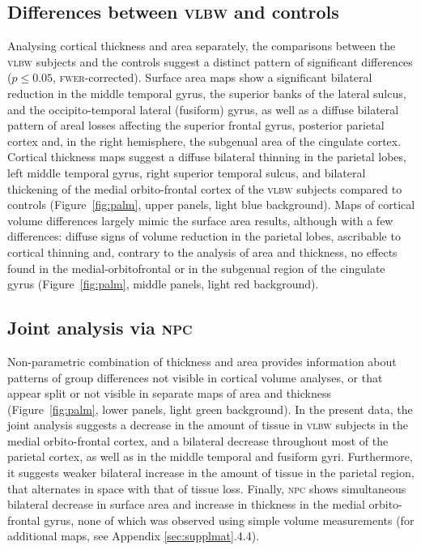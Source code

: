 \subsection{Differences between \textsc{vlbw} and controls}

Analysing cortical thickness and area separately, the comparisons between the \textsc{vlbw} subjects and the controls suggest a distinct pattern of significant differences ($p \leqslant 0.05$, \textsc{fwer}-corrected). Surface area maps show a significant bilateral reduction in the middle temporal gyrus, the superior banks of the lateral sulcus, and the occipito-temporal lateral (fusiform) gyrus, as well as a diffuse bilateral pattern of areal losses affecting the superior frontal gyrus, posterior parietal cortex and, in the right hemisphere, the subgenual area of the cingulate cortex. Cortical thickness maps suggest a diffuse bilateral thinning in the parietal lobes, left middle temporal gyrus, right superior temporal sulcus, and bilateral thickening of the medial orbito-frontal cortex of the \textsc{vlbw} subjects compared to controls (Figure~\ref{fig:palm}, upper panels, light blue background). Maps of cortical volume differences largely mimic the surface area results, although with a few differences: diffuse signs of volume reduction in the parietal lobes, ascribable to cortical thinning and, contrary to the analysis of area and thickness, no effects found in the medial-orbitofrontal or in the subgenual region of the cingulate gyrus (Figure~\ref{fig:palm}, middle panels, light red background).

\subsection{Joint analysis via \textsc{npc}}

Non-parametric combination of thickness and area provides information about patterns of group differences not visible in cortical volume analyses, or that appear split or not visible in separate maps of area and thickness (Figure~\ref{fig:palm}, lower panels, light green background). In the present data, the joint analysis suggests a decrease in the amount of tissue in \textsc{vlbw} subjects in the medial orbito-frontal cortex, and a bilateral decrease throughout most of the parietal cortex, as well as in the middle temporal and fusiform gyri. Furthermore, it suggests weaker bilateral increase in the amount of tissue in the parietal region, that alternates in space with that of tissue loss. Finally, \textsc{npc} shows simultaneous bilateral decrease in surface area and increase in thickness in the medial orbito-frontal gyrus, none of which was observed using simple volume measurements (for additional maps, see Appendix \ref{sec:supplmat}.4.4).

